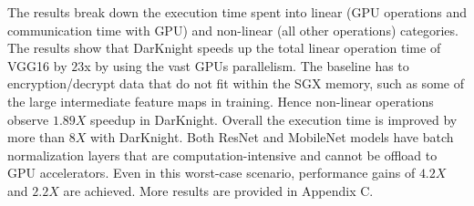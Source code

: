 The results break down the execution time spent into linear (GPU operations and communication time with GPU) and non-linear (all other operations) categories. %
The results show that DarKnight speeds up the total linear operation time of VGG16 by $23$x by using the vast GPUs parallelism. %
The baseline has to encryption/decrypt data that do not fit within the SGX memory, such as some of the large intermediate feature maps in training. Hence non-linear operations observe $1.89X$ speedup in DarKnight. Overall the execution time is improved by more than $8X$ with DarKnight. Both ResNet and MobileNet models have batch normalization layers that are computation-intensive and cannot be offload to GPU accelerators. Even in this worst-case scenario, performance gains of $4.2X$ and $2.2X$ are achieved. More results are provided in Appendix C. 








 
 



